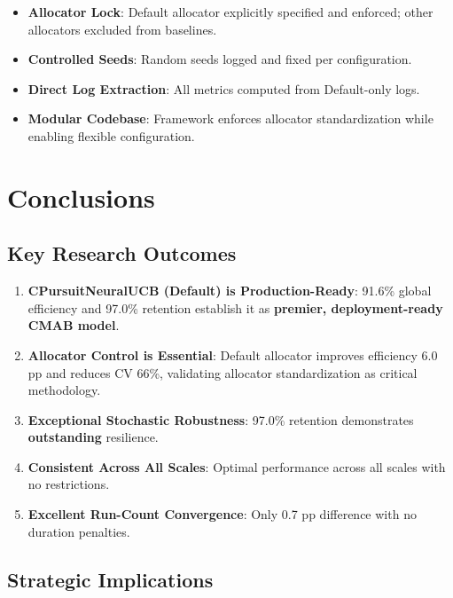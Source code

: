\documentclass[12pt,a4paper]{article}
\newcommand{\success}[1]{\textcolor{accentgreen}{\textbf{#1}}}
\begin{document}
\begin{itemize}
    \item \textbf{Allocator Lock}: Default allocator explicitly specified and enforced; other allocators excluded from baselines.
    \item \textbf{Controlled Seeds}: Random seeds logged and fixed per configuration.
    \item \textbf{Direct Log Extraction}: All metrics computed from Default-only logs.
    \item \textbf{Modular Codebase}: Framework enforces allocator standardization while enabling flexible configuration.
\end{itemize}

\newpage
\section{Conclusions}

\subsection{Key Research Outcomes}

\begin{enumerate}
    \item \success{\textbf{CPursuitNeuralUCB (Default) is Production-Ready}}: 91.6\% global efficiency and 97.0\% retention establish it as \success{premier, deployment-ready CMAB model}.
    
    \item \success{\textbf{Allocator Control is Essential}}: Default allocator improves efficiency 6.0 pp and reduces CV 66\%, validating allocator standardization as critical methodology.
    
    \item \success{\textbf{Exceptional Stochastic Robustness}}: 97.0\% retention demonstrates \textbf{outstanding} resilience.
    
    \item \success{\textbf{Consistent Across All Scales}}: Optimal performance across all scales with no restrictions.
    
    \item \success{\textbf{Excellent Run-Count Convergence}}: Only 0.7 pp difference with no duration penalties.
\end{enumerate}

\subsection{Strategic Implications}
\end{document}
